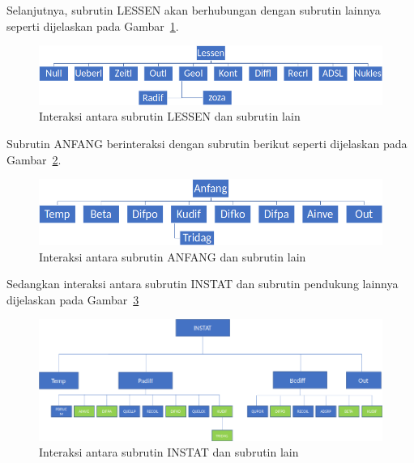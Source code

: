 \documentclass[a4paper,11pt]{report}
\newcommand{\putpdf}[1]{}
\renewcommand{\figurename}{Gambar}
\begin{document}
Selanjutnya, subrutin LESSEN akan berhubungan dengan subrutin lainnya seperti dijelaskan pada \figurename~\ref{fig:interaction1}.
\begin{figure}[h!]
  \begin{center}
    \includegraphics[scale=.35]{pics/intertaction1.png}
    \caption{Interaksi antara subrutin LESSEN dan subrutin lain}
    \label{fig:interaction1}
  \end{center}
\end{figure}

Subrutin ANFANG berinteraksi dengan subrutin berikut seperti dijelaskan pada \figurename~\ref{fig:interaction2}.
\begin{figure}[h!]
  \begin{center}
    \includegraphics[scale=.35]{pics/intertaction2.png}
    \caption{Interaksi antara subrutin ANFANG dan subrutin lain}
    \label{fig:interaction2}
  \end{center}
\end{figure}

Sedangkan interaksi antara subrutin INSTAT dan subrutin pendukung lainnya dijelaskan pada \figurename~\ref{fig:interaction3}
\begin{figure}[h!]
  \begin{center}
    \includegraphics[scale=.4]{pics/intertaction3.png}
    \caption{Interaksi antara subrutin INSTAT dan subrutin lain}
    \label{fig:interaction3}
  \end{center}
\end{figure}



%	
%	
\end{document}
